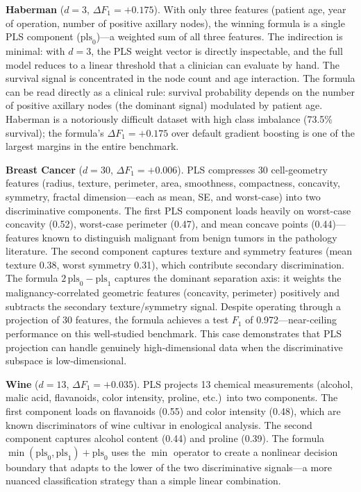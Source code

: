 \documentclass[journal]{IEEEtran}
\begin{document}
\textbf{Haberman} ($d = 3$, $\Delta F_1 = +0.175$).
With only three features (patient age, year of operation, number of
positive axillary nodes), the winning formula is a single PLS
component ($\mathrm{pls}_0$)---a weighted sum of all three features.
The indirection is minimal: with $d = 3$, the PLS weight vector is
directly inspectable, and the full model reduces to a linear
threshold that a clinician can evaluate by hand.  The survival signal
is concentrated in the node count and age interaction.
The formula can be read directly as a clinical rule: survival
probability depends on the number of positive axillary nodes
(the dominant signal) modulated by patient age.
Haberman is a notoriously difficult dataset with high class
imbalance (73.5\% survival); the formula's $\Delta F_1 = +0.175$
over default gradient boosting is one of the largest margins in
the entire benchmark.

\textbf{Breast Cancer} ($d = 30$, $\Delta F_1 = +0.006$).
PLS compresses 30 cell-geometry features (radius, texture,
perimeter, area, smoothness, compactness, concavity, symmetry,
fractal dimension---each as mean, SE, and worst-case) into two
discriminative components.  The first PLS component loads heavily on
worst-case concavity (0.52), worst-case perimeter (0.47), and mean
concave points (0.44)---features known to distinguish malignant from
benign tumors in the pathology literature.  The second component
captures texture and symmetry features (mean texture 0.38, worst
symmetry 0.31), which contribute secondary discrimination.
The formula $2\,\mathrm{pls}_0 - \mathrm{pls}_1$ captures the
dominant separation axis: it weights the malignancy-correlated
geometric features (concavity, perimeter) positively and subtracts
the secondary texture/symmetry signal.  Despite operating through a
projection of 30 features, the formula achieves a test $F_1$ of
0.972---near-ceiling performance on this well-studied benchmark.
This case demonstrates that PLS projection can handle genuinely
high-dimensional data when the discriminative subspace is
low-dimensional.

\textbf{Wine} ($d = 13$, $\Delta F_1 = +0.035$).
PLS projects 13 chemical measurements (alcohol, malic acid,
flavanoids, color intensity, proline, etc.)\ into two components.
The first component loads on flavanoids (0.55) and color intensity
(0.48), which are known discriminators of wine cultivar in
enological analysis.  The second component captures alcohol content
(0.44) and proline (0.39).  The formula
$\min(\mathrm{pls}_0, \mathrm{pls}_1) + \mathrm{pls}_0$ uses the
$\min$ operator to create a nonlinear decision boundary that adapts
to the lower of the two discriminative signals---a more nuanced
classification strategy than a simple linear combination.
\end{document}
